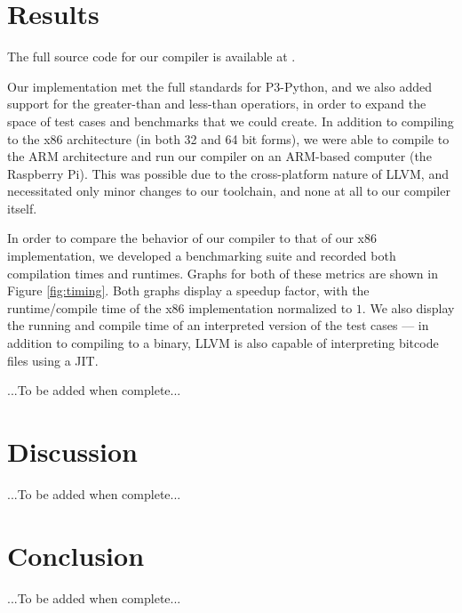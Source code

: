 \documentclass[11pt,twocolumn]{article}
\begin{document}


\section{Results}

The full source code for our compiler is available at \cite{github-repo}.

Our implementation met the full standards for P3-Python, and we also
added support for the greater-than and less-than operatiors, in order
to expand the space of test cases and benchmarks that we could
create. In addition to compiling to the x86 architecture (in both 32
and 64 bit forms), we were able to compile to the ARM architecture and
run our compiler on an ARM-based computer (the Raspberry Pi). This was
possible due to the cross-platform nature of LLVM, and necessitated
only minor changes to our toolchain, and none at all to our compiler
itself.

In order to compare the behavior of our compiler to that of our x86
implementation, we developed a benchmarking suite and recorded both
compilation times and runtimes. Graphs for both of these metrics are
shown in Figure \ref{fig:timing}. Both graphs display a speedup
factor, with the runtime/compile time of the x86 implementation
normalized to $1$. We also display the running and compile time of an
interpreted version of the test cases --- in addition to compiling to
a binary, LLVM is also capable of interpreting bitcode files using a JIT.


...To be added when complete...

\section{Discussion}

...To be added when complete...

\section{Conclusion}

...To be added when complete...

\nocite{*}
\printbibliography
\end{document}

